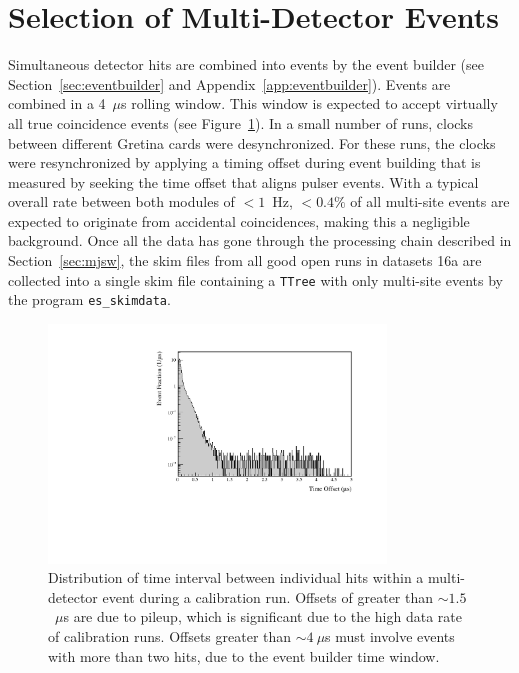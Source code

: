 \documentclass[/main.tex]{subfiles}
\begin{document}
\section{Selection of Multi-Detector Events}
Simultaneous detector hits are combined into events by the event builder (see Section~\ref{sec:eventbuilder} and Appendix~\ref{app:eventbuilder}).
Events are combined in a 4~$\mu$s rolling window.
This window is expected to accept virtually all true coincidence events (see Figure~\ref{fig:toffset}).
In a small number of runs, clocks between different Gretina cards were desynchronized.
For these runs, the clocks were resynchronized by applying a timing offset during event building that is measured by seeking the time offset that aligns pulser events.
With a typical overall rate between both modules of $<1$~Hz, $<0.4\%$ of all multi-site events are expected to originate from accidental coincidences, making this a negligible background.
Once all the data has gone through the processing chain described in Section~\ref{sec:mjsw}, the skim files from all good open runs in datasets 1\-6a are collected into a single skim file containing a \texttt{TTree} with only multi-site events by the program \texttt{es\_skimdata}.

\begin{figure}[ht]
  \centering
  \includegraphics[width=0.8\textwidth]{toffset}
  \caption[Distribution of offset times within multi-detector events]{\label{fig:toffset}
    Distribution of time interval between individual hits within a multi-detector event during a  calibration run. Offsets of greater than ${\sim}1.5$~$\mu$s are due to pileup, which is significant due to the high data rate of calibration runs. Offsets greater than ${\sim}4~\mu$s must involve events with more than two hits, due to the event builder time window.}
\end{figure}
\end{document}
